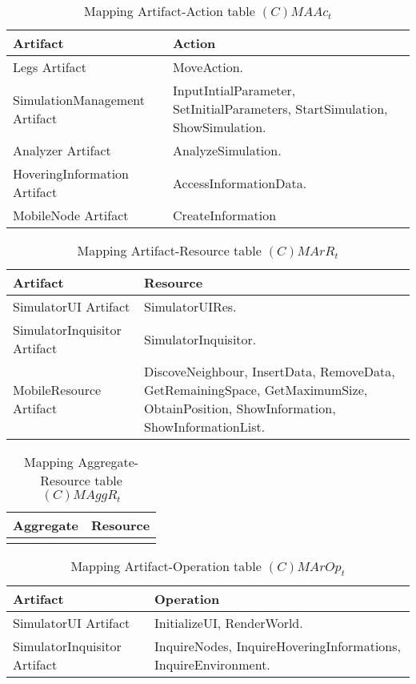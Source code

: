 \begin{table}[H]
	\centering
	\begin{tabular}{|p{4cm}|p{8cm}|}
			\hline
			\textbf{Artifact} & \textbf{Action} \\
			\hline
			Legs Artifact & MoveAction. \\
			\hline
			SimulationManagement Artifact & InputIntialParameter,
			SetInitialParameters, StartSimulation, ShowSimulation. \\
			\hline
			Analyzer Artifact & AnalyzeSimulation. \\
			\hline
			HoveringInformation Artifact & AccessInformationData. \\
			\hline
			MobileNode Artifact & CreateInformation \\
			\hline
		\end{tabular}
	\caption{Mapping Artifact-Action table $(C)MAAc_t$}
	\label{tab:cmaact}
\end{table}

\begin{table}[H]
	\centering
	\begin{tabular}{|p{4cm}|p{8cm}|}
			\hline
			\textbf{Artifact} & \textbf{Resource} \\
			\hline
			SimulatorUI Artifact & SimulatorUIRes. \\
			\hline
			SimulatorInquisitor Artifact & SimulatorInquisitor. \\
			\hline
			MobileResource Artifact & DiscoveNeighbour, InsertData, RemoveData,
			GetRemainingSpace, GetMaximumSize, ObtainPosition, ShowInformation,
			ShowInformationList. \\
			\hline
		\end{tabular}
	\caption{Mapping Artifact-Resource table $(C)MArR_t$}
	\label{tab:cmarrt}
\end{table}

\begin{table}[H]
	\centering
	\begin{tabular}{|p{4cm}|p{8cm}|}
			\hline
			\textbf{Aggregate} & \textbf{Resource} \\
			\hline
			& \\
			\hline
		\end{tabular}
	\caption{Mapping Aggregate-Resource table $(C)MAggR_t$}
	\label{tab:cmaggrt}
\end{table}

\begin{table}[H]
	\centering
	\begin{tabular}{|p{4cm}|p{8cm}|}
			\hline
			\textbf{Artifact} & \textbf{Operation} \\
			\hline
			SimulatorUI Artifact & InitializeUI, RenderWorld. \\
			\hline
			SimulatorInquisitor Artifact & InquireNodes, InquireHoveringInformations,
			InquireEnvironment. \\
			\hline
		\end{tabular}
	\caption{Mapping Artifact-Operation table $(C)MArOp_t$}
	\label{tab:cmaropt}
\end{table}

